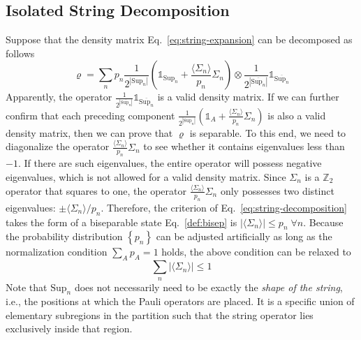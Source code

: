 \documentclass[12font]{article}
\numberwithin{equation}{section}    %
\theoremstyle{definition}
\newcommand{\anglelr}[1]{\langle #1 \rangle}
\newcommand{\lr}[1]{\left(  #1  \right)}
\newcommand{\lrg}[1]{\left\{  #1  \right\}}
\newcommand{\abs}[1]{\left|  #1  \right|}
\newcommand{\mrm}[1]{\mathrm{#1}}
\begin{document}
\subsection{Isolated String Decomposition}
Suppose that the density matrix Eq.~\eqref{eq:string-expansion} can be decomposed as follows
\begin{equation}\label{eq:string-decomposition}
    \varrho
    =
    \sum_{n} p_{n} \frac{1}{2^{\abs{\mrm{Sup}_n}}}
    \lr{\mathds{1}_{\mrm{Sup}_n} + \frac{\anglelr{\Sigma_n}}{p_{n}}\Sigma_n} \otimes \frac{1}{2^{\abs{\overline{\mrm{Sup}_n}}}}\mathds{1}_{\overline{\mrm{Sup}_n}}
\end{equation}
Apparently, the operator $\frac{1}{2^{\abs{\overline{\mrm{Sup}_n}}}}\mathds{1}_{\overline{\mrm{Sup}_n}}$ is a valid density matrix. If we can further confirm that each preceding component $\frac{1}{2^{\abs{\mrm{Sup}_n}}}
\lr{\mathds{1}_{A} + \frac{\anglelr{\Sigma_n}}{p_{n}}\Sigma_{n}}$ is also a valid density matrix, then we can prove that $\varrho$ is separable. To this end, we need to diagonalize the operator $\frac{\anglelr{\Sigma_n}}{p_{n}}\Sigma_{n}$ to see whether it contains eigenvalues less than $-1$. If there are such eigenvalues, the entire operator will possess negative eigenvalues, which is not allowed for a valid density matrix. Since $\Sigma_{n}$ is a $\mathbb{Z}_2$ operator that squares to one, the operator $\frac{\anglelr{\Sigma_n}}{p_{n}}\Sigma_{n}$ only possesses two distinct eigenvalues: $\pm \anglelr{\Sigma_n}/p_{n}$. Therefore, the criterion of Eq.~\eqref{eq:string-decomposition} takes the form of a biseparable state Eq.~\eqref{def:bisep} is $\abs{\anglelr{\Sigma_n}} \leq p_{n} \; \forall n $.
Because the probability distribution $\lrg{p_n}$ can be adjusted artificially as long as the normalization condition $\sum_{{A}}p_{A}=1$ holds, the above condition can be relaxed to
\begin{equation}\label{eq:string-decomp-condition}
    \sum_{n}\abs{\anglelr{\Sigma_n}} \leq 1
\end{equation}
Note that $\mrm{Sup}_n$ does not necessarily need to be exactly the \textit{shape of the string}, i.e., the positions at which the Pauli operators are placed. It is a specific union of elementary subregions in the partition such that the string operator lies exclusively inside that region.
\end{document}
